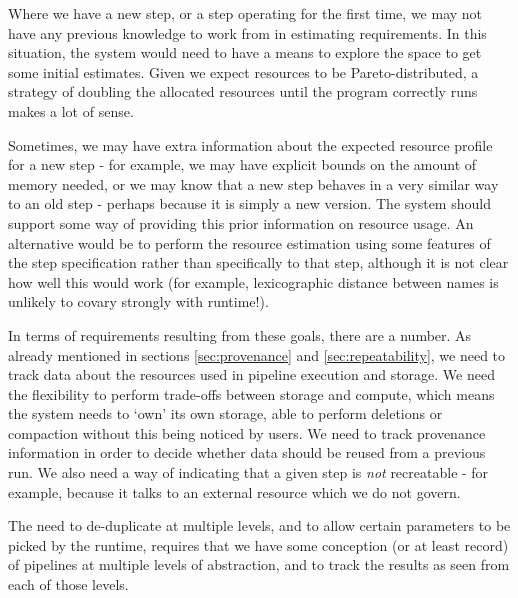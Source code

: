 \documentclass[10pt,a4paper]{article}
\newcommand{\npar}{\par\noindent\space}
\begin{document}
\begin{enumerate}
Where we have a new step, or a step operating for the first time, we may not have any previous knowledge to work from in estimating requirements. In this situation, the system would need to have a means to explore the space to get some initial estimates. Given we expect resources to be Pareto-distributed, a strategy of doubling the allocated resources until the program correctly runs makes a lot of sense.

Sometimes, we may have extra information about the expected resource profile for a new step - for example, we may have explicit bounds on the amount of memory needed, or we may know that a new step behaves in a very similar way to an old step - perhaps because it is simply a new version. The system should support some way of providing this prior information on resource usage. An alternative would be to perform the resource estimation using some features of the step specification rather than specifically to that step, although it is not clear how well this would work (for example, lexicographic distance between names is unlikely to covary strongly with runtime!).
\end{enumerate}

\npar In terms of requirements resulting from these goals, there are a number. As already mentioned in sections \ref{sec:provenance} and \ref{sec:repeatability}, we need to track data about the resources used in pipeline execution and storage. We need the flexibility to perform trade-offs between storage and compute, which means the system needs to `own' its own storage, able to perform deletions or compaction without this being noticed by users. We need to track provenance information in order to decide whether data should be reused from a previous run. We also need a way of indicating that a given step is \textit{not} recreatable - for example, because it talks to an external resource which we do not govern.
\npar The need to de-duplicate at multiple levels, and to allow certain parameters to be picked by the runtime, requires that we have some conception (or at least record) of pipelines at multiple levels of abstraction, and to track the results as seen from each of those levels.
\end{document}
